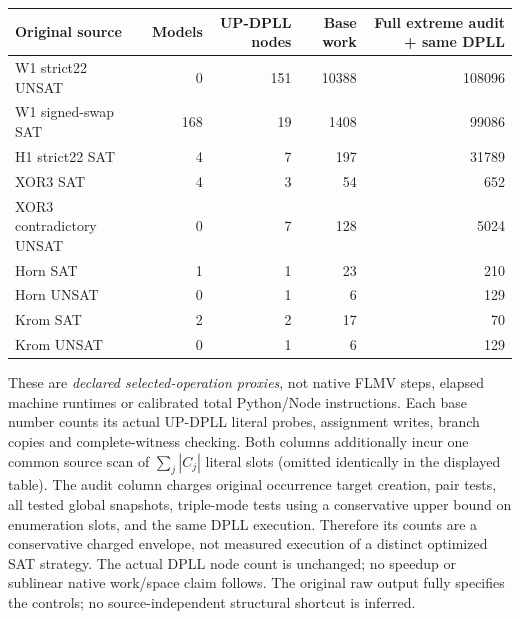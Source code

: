 \documentclass[11pt]{article}
\begin{document}
\begin{center}\begin{tabular}{lrrrr}\toprule
Original source&Models&UP-DPLL nodes&Base work&Full extreme audit + same DPLL\\\midrule
W1 strict22 UNSAT&0&151&10388&108096\\
W1 signed-swap SAT&168&19&1408&99086\\
H1 strict22 SAT&4&7&197&31789\\
XOR3 SAT&4&3&54&652\\
XOR3 contradictory UNSAT&0&7&128&5024\\
Horn SAT&1&1&23&210\\
Horn UNSAT&0&1&6&129\\
Krom SAT&2&2&17&70\\
Krom UNSAT&0&1&6&129\\\bottomrule
\end{tabular}\end{center}
These are \emph{declared selected-operation proxies}, not native FLMV steps, elapsed machine runtimes or calibrated total Python/Node instructions. Each base number counts its actual UP-DPLL literal probes, assignment writes, branch copies and complete-witness checking. Both columns additionally incur one common source scan of $\sum_j|C_j|$ literal slots (omitted identically in the displayed table). The audit column charges original occurrence target creation, pair tests, all tested global snapshots, triple-mode tests using a conservative upper bound on enumeration slots, and the same DPLL execution. Therefore its counts are a conservative charged envelope, not measured execution of a distinct optimized SAT strategy. The actual DPLL node count is unchanged; no speedup or sublinear native work/space claim follows. The original raw output fully specifies the controls; no source-independent structural shortcut is inferred.
\end{document}
